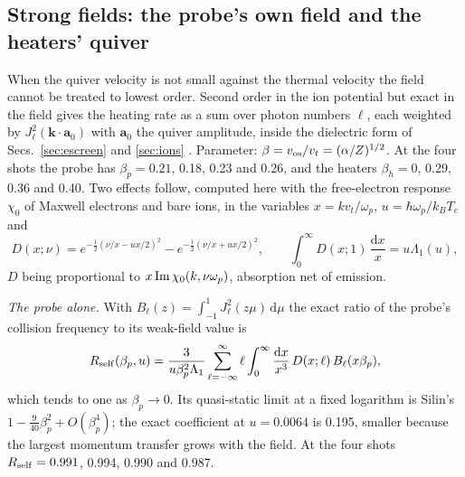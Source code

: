 \documentclass[11pt]{article}
\numberwithin{equation}{section}
\newcommand{\dd}{\mathrm d}
\newcommand{\kB}{k_B}
\newcommand{\vos}{v_{\rm os}}
\begin{document}
\subsection{Strong fields: the probe's own field and the heaters' quiver}
\label{sec:fields}
When the quiver velocity is not small against the thermal velocity the field cannot be
treated to lowest order. Second order in the ion potential but exact in the field gives the
heating rate as a sum over photon numbers $\ell$, each weighted by $J_\ell^2(\mathbf k\cdot\mathbf a_0)$
with $\mathbf a_0$ the quiver amplitude, inside the dielectric form of Secs.~\ref{sec:escreen} and \ref{sec:ions}
\cite{KullPlagne2001,Bornath2001,Decker1994}. Parameter: $\beta=\vos/v_t=(\alpha/Z)^{1/2}$.
At the four shots the probe has $\beta_p=0.21$, 0.18, 0.23 and 0.26, and the heaters
$\beta_h=0$, 0.29, 0.36 and 0.40. Two effects follow, computed here with the free-electron
response $\chi_0$ of Maxwell electrons and bare ions, in the variables $x=kv_t/\omega_p$,
$u=\hbar\omega_p/\kB T_e$ and
\begin{equation}
D(x;\nu)=e^{-\frac12(\nu/x-ux/2)^2}-e^{-\frac12(\nu/x+ux/2)^2},\qquad
\int_0^\infty D(x;1)\,\frac{\dd x}{x}=u\Lambda_1(u),
\label{eq:D}
\end{equation}
$D$ being proportional to $x\,{\rm Im}\,\chi_0(k,\nu\omega_p)$, absorption net of emission.

{\noindent}\emph{The probe alone.} With $B_\ell(z)=\int_{-1}^1J_\ell^2(z\mu)\,\dd\mu$ the exact
ratio of the probe's collision frequency to its weak-field value is
\begin{equation}
R_{\rm self}(\beta_p,u)=\frac{3}{u\beta_p^2\Lambda_1}\sum_{\ell=-\infty}^\infty\ell
\int_0^\infty\frac{\dd x}{x^3}\,D(x;\ell)\,B_\ell(x\beta_p),
\label{eq:Rself}
\end{equation}
which tends to one as $\beta_p\to0$. Its quasi-static limit at a fixed logarithm is Silin's
$1-\tfrac{9}{40}\beta_p^2+O(\beta_p^4)$; the exact coefficient at $u=0.0064$ is 0.195, smaller
because the largest momentum transfer grows with the field. At the four shots
$R_{\rm self}=0.991$, 0.994, 0.990 and 0.987.
\end{document}
